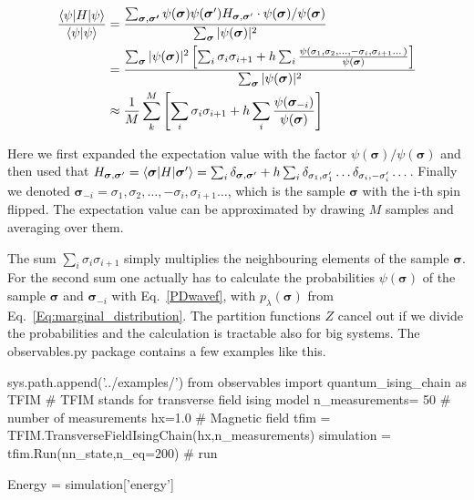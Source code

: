 \documentclass[submission, Phys]{SciPost}
\begin{document}
\begin{align}
\frac{\braket{\psi | H | \psi}}{\braket{\psi | \psi}} &= \frac{\sum_{\bm{\sigma}, \bm{\sigma'}} \psi(\bm{\sigma}) \psi (\bm{\sigma}') H_{\bm{\sigma}, \bm{\sigma}'} \cdot \psi(\bm{\sigma}) / \psi(\bm{\sigma})}{ \sum_{\bm{\sigma}} | \psi(\bm{\sigma})|^2}  \\
&=  \frac{\sum_{\bm{\sigma}} | \psi({\bm{\sigma}}) |^2 \left[ \sum_i \sigma_i \sigma_{i+1} + h \sum_i \frac{\psi(\sigma_1, \sigma_2, \dots , -\sigma_i, \sigma_{i+1} \dots)}{\psi (\bm{\sigma})} \right]}{\sum_{\bm{\sigma}} | \psi({\bm{\sigma}} )|^2} \\
&\approx \frac{1}{M} \sum_k^M \left[ \sum_i \sigma_i \sigma_{i+1} + h \sum_i \frac{\psi (\bm{\sigma}_{-i})}{\psi (\bm{\sigma})} \right]
\end{align}

Here we first expanded the expectation value with the factor $\psi(\bm{\sigma}) / \psi(\bm{\sigma})$ and then used that $H_{\bm{\sigma}, \bm{\sigma}'}  = \braket{\bm{\sigma} | H | \bm{\sigma}'} = \sum_i \delta_{\bm{\sigma}, \bm{\sigma}'} + h \sum_i \delta_{\sigma_1, \sigma_1'} \dots \delta_{\sigma_i, -\sigma_i'} \dots$. Finally we denoted $\bm{\sigma}_{-i} = \sigma_1, \sigma_2, \dots , -\sigma_i, \sigma_{i+1} \dots$, which is the sample $\bm{\sigma}$ with the i-th spin flipped.
The expectation value can be approximated by drawing $M$ samples and averaging over them.

The sum $\sum_i \sigma_i \sigma_{i+1}$ simply multiplies the neighbouring elements of the sample $\bm{\sigma}$. For the second sum one actually has to calculate the probabilities $\psi (\bm{\sigma})$ of the sample $\bm{\sigma}$ and $\bm{\sigma}_{-i} $ with
Eq.~\ref{PDwavef},
with $p_{\lambda}(\bm{\sigma})$ from Eq.~\ref{Eq:marginal_distribution}. The partition functions $Z$ cancel out if we divide the probabilities and the calculation is tractable also for big systems.
The observables.py package contains a few examples like this.

\begin{python}
sys.path.append('../examples/')
from observables import quantum_ising_chain as TFIM
# TFIM stands for transverse field ising model
n_measurements= 50 # number of measurements
hx=1.0             # Magnetic field
tfim = TFIM.TransverseFieldIsingChain(hx,n_measurements)
simulation = tfim.Run(nn_state,n_eq=200) # run 

Energy = simulation['energy']
\end{python}
\end{document}
